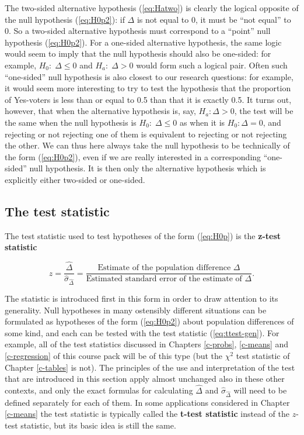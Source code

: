 \documentclass[11pt,a4paper,openany]{book}
\begin{document}
The two-sided alternative hypothesis (\ref{eq:Hatwo}) is clearly the
logical opposite of the null hypothesis (\ref{eq:H0p2}): if \(\Delta\)
is not equal to 0, it must be ``not equal'' to 0. So a two-sided
alternative hypothesis must correspond to a ``point'' null hypothesis
(\ref{eq:H0p2}). For a one-sided alternative hypothesis, the same logic
would seem to imply that the null hypothesis should also be one-sided:
for example, \(H_{0}: \; \Delta\le 0\) and \(H_{a}:\; \Delta>0\) would
form such a logical pair. Often such ``one-sided'' null hypothesis is
also closest to our research questions: for example, it would seem more
interesting to try to test the hypothesis that the proportion of
Yes-voters is less than or equal to 0.5 than that it is exactly 0.5. It
turns out, however, that when the alternative hypothesis is, say,
\(H_{a}: \Delta>0\), the test will be the same when the null hypothesis
is \(H_{0}: \; \Delta\le 0\) as when it is \(H_{0}: \Delta= 0\), and
rejecting or not rejecting one of them is equivalent to rejecting or not
rejecting the other. We can thus here always take the null hypothesis to
be technically of the form (\ref{eq:H0p2}), even if we are really
interested in a corresponding ``one-sided'' null hypothesis. It is then
only the alternative hypothesis which is explicitly either two-sided or
one-sided.

\subsection{The test
statistic}\label{ss-probs-test1sample-teststatistic}

The test statistic used to test hypotheses of the form (\ref{eq:H0p}) is
the \textbf{z-test statistic}

\begin{equation}z=
\frac{\hat{\Delta}}{\hat{\sigma}_{\hat{\Delta}}}=
\frac{\text{Estimate of the population difference $\Delta$}}
{\text{Estimated standard error
of the estimate of $\Delta$}}.
\label{eq:ttest-gen}\end{equation}

The statistic is introduced first in this form in order to draw
attention to its generality. Null hypotheses in many ostensibly
different situations can be formulated as hypotheses of the form
(\ref{eq:H0p2}) about population differences of some kind, and each can
be tested with the test statistic (\ref{eq:ttest-gen}). For example, all
of the test statistics discussed in Chapters \ref{c-probs},
\ref{c-means} and \ref{c-regression} of this course pack will be of this
type (but the \(\chi^{2}\) test statistic of Chapter \ref{c-tables} is
not). The principles of the use and interpretation of the test that are
introduced in this section apply almost unchanged also in these other
contexts, and only the exact formulas for calculating \(\hat{\Delta}\)
and \(\hat{\sigma}_{\hat{\Delta}}\) will need to be defined separately
for each of them. In some applications considered in Chapter
\ref{c-means} the test statistic is typically called the \textbf{t-test
statistic} instead of the \(z\)-test statistic, but its basic idea is
still the same.
\end{document}
